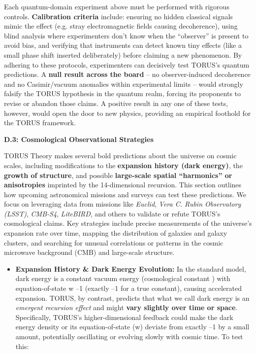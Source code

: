 \documentclass[]{article}
\begin{document}
{Each quantum-domain experiment above must be performed with rigorous
controls. \textbf{Calibration criteria} include: ensuring no hidden
classical signals mimic the effect (e.g. stray electromagnetic fields
causing decoherence), using blind analysis where experimenters don't
know when the ``observer'' is present to avoid bias, and verifying that
instruments can detect known tiny effects (like a small phase shift
inserted deliberately) before claiming a new phenomenon. By adhering to
these protocols, experimenters can decisively test TORUS's quantum
predictions. A \textbf{null result across the board} -- no
observer-induced decoherence and no Casimir/vacuum anomalies within
experimental limits -- would strongly falsify the TORUS hypothesis in
the quantum realm, forcing its proponents to revise or abandon those
claims. A positive result in any one of these tests, however, would open
the door to new physics, providing an empirical foothold for the TORUS
framework.

\textbf{D.3: Cosmological Observational Strategies}

TORUS Theory makes several bold predictions about the universe on cosmic
scales, including modifications to the \textbf{expansion history (dark
energy)}, the \textbf{growth of structure}, and possible
\textbf{large-scale spatial ``harmonics'' or anisotropies} imprinted by
the 14-dimensional recursion. This section outlines how upcoming
astronomical missions and surveys can test these predictions. We focus
on leveraging data from missions like \emph{Euclid}, \emph{Vera C. Rubin
Observatory (LSST)}, \emph{CMB-S4}, \emph{LiteBIRD}, and others to
validate or refute TORUS's cosmological claims. Key strategies include
precise measurements of the universe's expansion rate over time, mapping
the distribution of galaxies and galaxy clusters, and searching for
unusual correlations or patterns in the cosmic microwave background
(CMB) and large-scale structure.

\begin{itemize}
\item
  \textbf{Expansion History \& Dark Energy Evolution:} In the standard
  \LambdaCDM model, dark energy is a constant vacuum energy (cosmological
  constant \Lambda) with equation-of-state w \approx --1 (exactly --1 for a true
  constant), causing accelerated expansion. TORUS, by contrast, predicts
  that what we call dark energy is an \emph{emergent recursion effect}
  and might \textbf{vary slightly over time or space}​. Specifically,
  TORUS's higher-dimensional feedback could make the dark energy density
  or its equation-of-state (w) deviate from exactly --1 by a small
  amount, potentially oscillating or evolving slowly with cosmic time​.
  To test this:


\end{itemize}}
\end{document}
